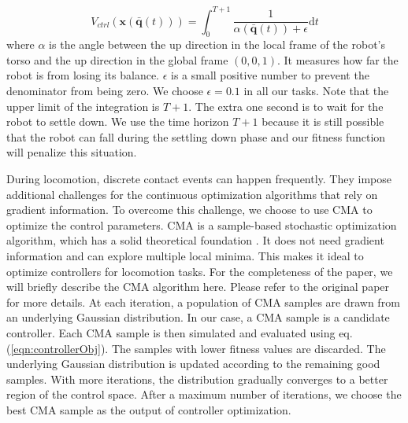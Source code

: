 \begin{equation}
  V_{ctrl}(\mathbf{x}(\bar{\mathbf{q}}(t)))=\int_0^{T+1} \frac{1}{\alpha(\bar{\mathbf{q}}(t))+\epsilon}\mathrm{d}t
  \label{eqn:controllerObj}
\end{equation}
where $\alpha$ is the angle between the up direction in the local frame of the robot's torso and the up direction in the global frame $(0,0,1)$. It measures how far the robot is from losing its balance. $\epsilon$ is a small positive number to prevent the denominator from being zero. We choose $\epsilon=0.1$ in all our tasks. Note that the upper limit of the integration is $T+1$. The extra one second is to wait for the robot to settle down. We use the time horizon $T+1$ because it is still possible that the robot can fall during the settling down phase and our fitness function will penalize this situation.

During locomotion, discrete contact events can happen frequently. They impose additional challenges for the continuous optimization algorithms that rely on gradient information. To overcome this challenge, we choose to use CMA to optimize the control parameters. CMA is a sample-based stochastic optimization algorithm, which has a solid theoretical foundation \cite{akimoto:2010,glasmachers:2010}. It does not need gradient information and can explore multiple local minima. This makes it ideal to optimize controllers for locomotion tasks. For the completeness of the paper, we will briefly describe the CMA algorithm here. Please refer to the original paper \cite{Hansen:2009} for more details. At each iteration, a population of CMA samples are drawn from an underlying Gaussian distribution. In our case, a CMA sample is a candidate controller. Each CMA sample is then simulated and evaluated using eq.(\ref{eqn:controllerObj}). The samples with lower fitness values are discarded. The underlying Gaussian distribution is updated according to the remaining good samples. With more iterations, the distribution gradually converges to a better region of the control space. After a maximum number of iterations, we choose the best CMA sample as the output of controller optimization.
